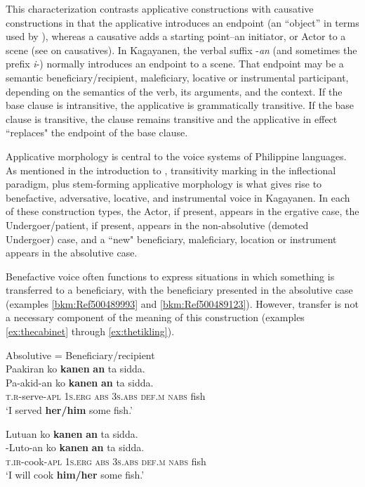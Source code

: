 This characterization contrasts applicative constructions with causative constructions in that the applicative introduces an endpoint (an “object” in terms used by \citealt{polinsky2013}), whereas a causative adds a starting point--an initiator, or Actor to a scene (see  on causatives). In Kagayanen, the verbal suffix -\textit{an} (and sometimes the prefix \textit{i}-) normally introduces an endpoint to a scene. That endpoint may be a semantic beneficiary/recipient, maleficiary, locative or instrumental participant, depending on the semantics of the verb, its arguments, and the context. If the base clause is intransitive, the applicative is grammatically transitive. If the base clause is transitive, the clause remains transitive and the applicative in effect “replaces" the endpoint of the base clause.

\hspace*{-.2pt}Applicative morphology is central to the voice systems of Philippine languages. As mentioned in the introduction to , transitivity marking in the inflectional paradigm, plus stem-forming applicative morphology is what gives rise to benefactive, adversative, locative, and instrumental voice in Kagayanen. In each of these construction types, the Actor, if present, appears in the ergative case, the Undergoer/patient, if present, appears in the non-absolutive (demoted Undergoer) case, and a “new"  beneficiary, maleficiary, location or instrument appears in the absolutive case.

Benefactive voice often functions to express situations in which something is transferred to a beneficiary, with the beneficiary presented in the absolutive case (examples \ref{bkm:Ref500489993} and \ref{bkm:Ref500489123}). However, transfer is not a necessary component of the meaning of this construction (examples \ref{ex:thecabinet} through \ref{ex:thetikling}).

\ea
\label{bkm:Ref500489993}
Absolutive = Beneficiary/recipient \\
Paakiran  ko  \emptyset{}   \textbf{kanen}  \textbf{an}  ta  sidda. \\\smallskip
\gll Pa-akid-an  ko  \emptyset{}   \textbf{kanen}  \textbf{an}  ta  sidda. \\
\textsc{t.r}-serve-\textsc{apl}  1\textsc{s.erg}  \textsc{abs}  3\textsc{s.abs}  \textsc{def.m}  \textsc{nabs}  fish \\
\glt ‘I served \textbf{her/him} some fish.’
\z

\ea
\label{bkm:Ref500489123}
Lutuan  ko  \emptyset{}  \textbf{kanen}  \textbf{an}  ta  sidda. \\\smallskip
\gll \emptyset{}-Luto-an  ko  \emptyset{}  \textbf{kanen}  \textbf{an}  ta  sidda. \\
\textsc{t.ir}-cook-\textsc{apl}  1\textsc{s.erg}  \textsc{abs}  3\textsc{s.abs}  \textsc{def.m}  \textsc{nabs}  fish \\
\glt ‘I will cook \textbf{him/her} some fish.’
\z

